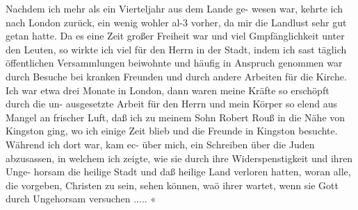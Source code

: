 Nachdem ich mehr als ein Vierteljahr aus dem Lande ge-
wesen war, kehrte ich nach London zurück, ein wenig wohler al-3
vorher, da mir die Landlust sehr gut getan hatte. Da es eine
Zeit großer Freiheit war und viel Gmpfänglichkeit unter den
Leuten, so wirkte ich viel für den Herrn in der Stadt, indem ich
sast täglich öffentlichen Versammlungen beiwohnte und häufig in
Anspruch genommen war durch Besuche bei kranken Freunden und
durch andere Arbeiten für die Kirche. Ich war etwa drei Monate
in London, dann waren meine Kräfte so erschöpft durch die un-
ausgesetzte Arbeit für den Herrn und mein Körper so elend aus
Mangel an frischer Luft, daß ich zu meinem Sohn Robert Rouß
in die Nähe von Kingston ging, wo ich einige Zeit blieb und die
Freunde in Kingston besuchte. Während ich dort war, kam ec-
über mich, ein Schreiben über die Juden abzusassen, in welchem
ich zeigte, wie sie durch ihre Widerspenstigkeit und ihren Unge-
horsam die heilige Stadt und daß heilige Land verloren hatten,
woran alle, die vorgeben, Christen zu sein, sehen können, waö
ihrer wartet, wenn sie Gott durch Ungehorsam versuchen ..... «

